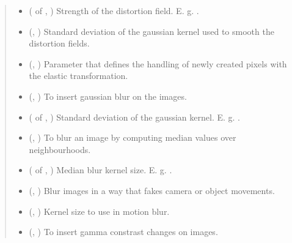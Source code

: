\documentclass[letterpaper,10pt,english]{sphinxmanual}
\begin{document}
\begin{fulllineitems}
\begin{quote}
\begin{description}
\begin{itemize}
\item {} 
 ( of , ) \textendash{} Strength of the distortion field. E. g. .

\item {} 
 (, ) \textendash{} Standard deviation of the gaussian kernel used to smooth the distortion fields.

\item {} 
 (, ) \textendash{} Parameter that defines the handling of newly created pixels with the elastic transformation.

\item {} 
 (, ) \textendash{} To insert gaussian blur on the images.

\item {} 
 ( of , ) \textendash{} Standard deviation of the gaussian kernel. E. g. .

\item {} 
 (, ) \textendash{} To blur an image by computing median values over neighbourhoods.

\item {} 
 ( of , ) \textendash{} Median blur kernel size. E. g. .

\item {} 
 (, ) \textendash{} Blur images in a way that fakes camera or object movements.

\item {} 
 (, ) \textendash{} Kernel size to use in motion blur.

\item {} 
 (, ) \textendash{} To insert gamma constrast changes on images.


\end{itemize}
\end{description}
\end{quote}
\end{fulllineitems}
\end{document}
